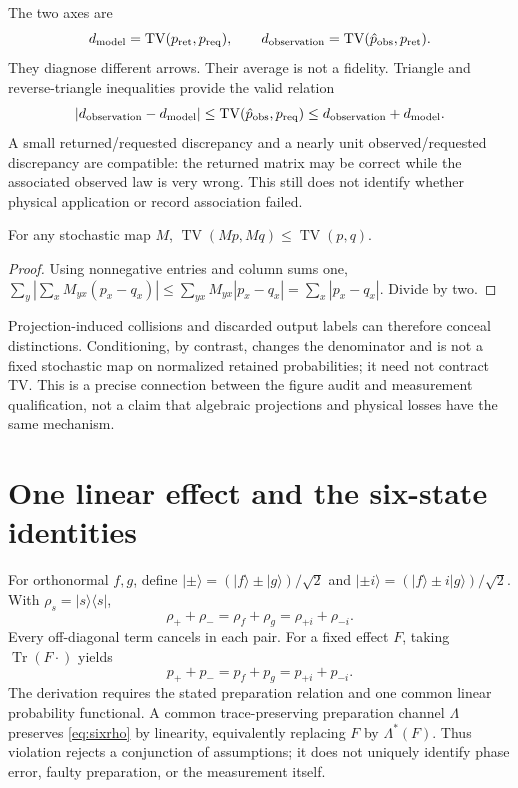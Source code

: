 \documentclass[11pt,a4paper]{article}
\newcommand{\tr}{\operatorname{Tr}}\newcommand{\TV}{\operatorname{TV}}\newcommand{\kerop}{\operatorname{ker}}\newcommand{\rank}{\operatorname{rank}}\newcommand{\diag}{\operatorname{diag}}\newcommand{\ran}{\operatorname{ran}}\newcommand{\norm}[1]{\left\lVert#1\right\rVert}\newcommand{\ket}[1]{\lvert#1\rangle}\newcommand{\bra}[1]{\langle#1\rvert}
\begin{document}
The two axes are
\begin{equation}
d_{\rm model}=\TV(p_{\rm ret},p_{\rm req}),\qquad
d_{\rm observation}=\TV(\hat p_{\rm obs},p_{\rm ret}).
\end{equation}
They diagnose different arrows. Their average is not a fidelity. Triangle and reverse-triangle inequalities provide the valid relation
\begin{equation}
|d_{\rm observation}-d_{\rm model}|
\le\TV(\hat p_{\rm obs},p_{\rm req})
\le d_{\rm observation}+d_{\rm model}.
\end{equation}
A small returned/requested discrepancy and a nearly unit observed/requested discrepancy are compatible: the returned matrix may be correct while the associated observed law is very wrong. This still does not identify whether physical application or record association failed.

\begin{proposition}
For any stochastic map $M$, $\TV(Mp,Mq)\le\TV(p,q)$.
\end{proposition}
\begin{proof}
Using nonnegative entries and column sums one,
$\sum_y|\sum_xM_{yx}(p_x-q_x)|\le\sum_{yx}M_{yx}|p_x-q_x|=\sum_x|p_x-q_x|$.
Divide by two.
\end{proof}
Projection-induced collisions and discarded output labels can therefore conceal distinctions. Conditioning, by contrast, changes the denominator and is not a fixed stochastic map on normalized retained probabilities; it need not contract TV. This is a precise connection between the figure audit and measurement qualification, not a claim that algebraic projections and physical losses have the same mechanism.

\section{One linear effect and the six-state identities}
For orthonormal $f,g$, define $\ket{\pm}=(\ket f\pm\ket g)/\sqrt2$ and $\ket{\pm i}=(\ket f\pm i\ket g)/\sqrt2$. With $\rho_s=\ket s\bra s$,
\begin{equation}\label{eq:sixrho}
\rho_++\rho_-=\rho_f+\rho_g=\rho_{+i}+\rho_{-i}.
\end{equation}
Every off-diagonal term cancels in each pair. For a fixed effect $F$, taking $\tr(F\cdot)$ yields
\begin{equation}\label{eq:six}
p_++p_-=p_f+p_g=p_{+i}+p_{-i}.
\end{equation}
The derivation requires the stated preparation relation and one common linear probability functional. A common trace-preserving preparation channel $\Lambda$ preserves \eqref{eq:sixrho} by linearity, equivalently replacing $F$ by $\Lambda^*(F)$. Thus violation rejects a conjunction of assumptions; it does not uniquely identify phase error, faulty preparation, or the measurement itself.
\end{document}
